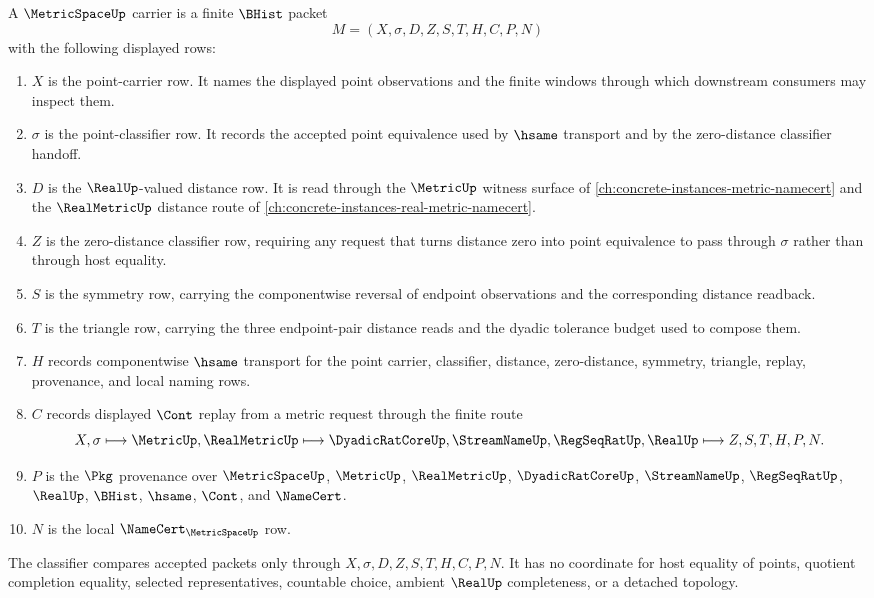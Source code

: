 \begin{definition}
\label{def:metric-space-carrier}
A $\MetricSpaceUp$ carrier is a finite $\BHist$ packet
$$
M=(X,\sigma,D,Z,S,T,H,C,P,N)
$$
with the following displayed rows:
\begin{enumerate}
\item $X$ is the point-carrier row. It names the displayed point observations and the finite windows through which downstream consumers may inspect them.
\item $\sigma$ is the point-classifier row. It records the accepted point equivalence used by $\hsame$ transport and by the zero-distance classifier handoff.
\item $D$ is the $\RealUp$-valued distance row. It is read through the $\MetricUp$ witness surface of \autoref{ch:concrete-instances-metric-namecert} and the $\RealMetricUp$ distance route of \autoref{ch:concrete-instances-real-metric-namecert}.
\item $Z$ is the zero-distance classifier row, requiring any request that turns distance zero into point equivalence to pass through $\sigma$ rather than through host equality.
\item $S$ is the symmetry row, carrying the componentwise reversal of endpoint observations and the corresponding distance readback.
\item $T$ is the triangle row, carrying the three endpoint-pair distance reads and the dyadic tolerance budget used to compose them.
\item $H$ records componentwise $\hsame$ transport for the point carrier, classifier, distance, zero-distance, symmetry, triangle, replay, provenance, and local naming rows.
\item $C$ records displayed $\Cont$ replay from a metric request through the finite route
$$
X,\sigma
\longmapsto
\MetricUp,\RealMetricUp
\longmapsto
\DyadicRatCoreUp,\StreamNameUp,\RegSeqRatUp,\RealUp
\longmapsto
Z,S,T,H,P,N .
$$
\item $P$ is the $\Pkg$ provenance over $\MetricSpaceUp$, $\MetricUp$, $\RealMetricUp$, $\DyadicRatCoreUp$, $\StreamNameUp$, $\RegSeqRatUp$, $\RealUp$, $\BHist$, $\hsame$, $\Cont$, and $\NameCert$.
\item $N$ is the local $\NameCert_{\MetricSpaceUp}$ row.
\end{enumerate}
The classifier compares accepted packets only through $X,\sigma,D,Z,S,T,H,C,P,N$. It has no coordinate for host equality of points, quotient completion equality, selected representatives, countable choice, ambient $\RealUp$ completeness, or a detached topology.
\end{definition}

